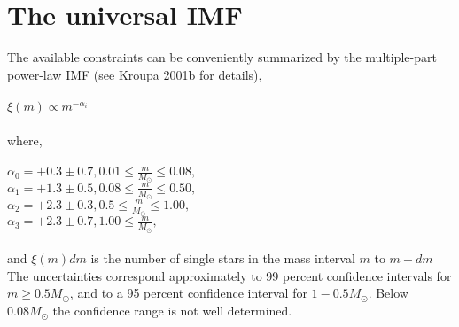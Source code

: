 \section{The universal IMF}

The available constraints can be conveniently summarized by the	multiple-part power-law IMF (see Kroupa 2001b for details),\\ \\ $\xi(m) \propto  m^{-\alpha_{i}}$\\ \\
where,\\ \\
$\alpha_{0}= +0.3\pm0.7,    0.01\leq \frac{m}{M_{\odot}} \le0.08,$\\
$\alpha_{1}= +1.3\pm0.5,     0.08\leq \frac{m}{M_{\odot}} \le 0.50,$\\
$\alpha_{2}= +2.3\pm0.3,     0.5\leq \frac{m}{M_{\odot}} \le 1.00,$\\
$\alpha_{3}= +2.3\pm0.7,     1.00\leq \frac{m}{M_{\odot}} ,$\\ \\ and $\xi(m)dm$ is the number of single stars in the mass interval $m$ to
	$m+dm$ The uncertainties correspond approximately to 99 percent confidence intervals for $m \geq 0.5 M_{\odot}$, and to a 95 percent confidence interval for $1-0.5 M_{\odot}$. Below $0.08 M_{\odot}$
	the confidence range is not well determined.
